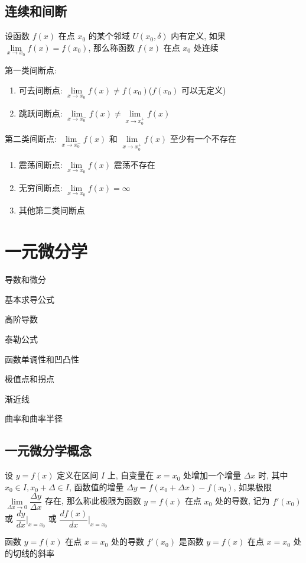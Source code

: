 \section{连续和间断}
\begin{definition}[连续点]
	设函数 $f(x)$ 在点 $x_{0}$ 的某个邻域 $U(x_{0},\delta)$ 内有定义, 如果 $\lim\limits_{x\to x_{0}}f(x)=f(x_{0})$, 那么称函数 $f(x)$ 在点 $x_{0}$ 处连续
\end{definition}

\begin{definition}[间断点]
	第一类间断点:
	\begin{enumerate}
		\item 可去间断点: $\lim\limits_{x\to x_{0}}f(x)\neq f(x_{0})$($f(x_{0})$ 可以无定义)
		\item 跳跃间断点: $\lim\limits_{x\to x_{0}^{-}}f(x)\neq \lim\limits_{x\to x_{0}^{+}}f(x)$
	\end{enumerate}

	第二类间断点: $\lim\limits_{x\to x_{0}^{-}}f(x)$ 和 $\lim\limits_{x\to x_{0}^{+}}f(x)$ 至少有一个不存在
	\begin{enumerate}
		\item 震荡间断点: $\lim\limits_{x\to x_{0}}f(x)$ 震荡不存在
		\item 无穷间断点: $\lim\limits_{x\to x_{0}}f(x)=\infty$
		\item 其他第二类间断点
	\end{enumerate}
\end{definition}
\chapter{一元微分学}
\begin{introduction}
	\item 导数和微分
	\item 基本求导公式
	\item 高阶导数
	\item 泰勒公式
	\item 函数单调性和凹凸性
	\item 极值点和拐点
	\item 渐近线
	\item 曲率和曲率半径
\end{introduction}

\section{一元微分学概念}
\begin{definition}[导数]
	设 $y=f(x)$ 定义在区间 $I$ 上, 自变量在 $x=x_{0}$ 处增加一个增量 $\Delta x$ 时, 其中 $x_{0}\in I, x_{0}+\Delta\in I$, 
	函数值的增量 $\Delta y=f(x_{0}+\Delta x)-f(x_{0})$, 如果极限 $\lim\limits_{\Delta x\to 0}\dfrac{\Delta y}{\Delta x}$ 存在, 
	那么称此极限为函数 $y=f(x)$ 在点 $x_{0}$ 处的导数, 记为 $f'(x_{0})$ 或 $\dfrac{dy}{dx}\big|_{x=x_{0}}$ 或 $\dfrac{df(x)}{dx}\big|_{x=x_{0}}$
\end{definition}
\begin{definition}[导数的几何意义]
	函数 $y=f(x)$ 在点 $x=x_{0}$ 处的导数 $f'(x_{0})$ 是函数 $y=f(x)$ 在点 $x=x_{0}$ 处的切线的斜率
\end{definition}

